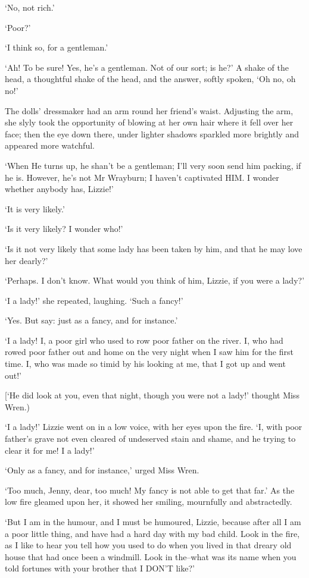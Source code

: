 ‘No, not rich.’

‘Poor?’

‘I think so, for a gentleman.’

‘Ah! To be sure! Yes, he’s a gentleman. Not of our sort; is he?’ A shake
of the head, a thoughtful shake of the head, and the answer, softly
spoken, ‘Oh no, oh no!’

The dolls’ dressmaker had an arm round her friend’s waist. Adjusting the
arm, she slyly took the opportunity of blowing at her own hair where
it fell over her face; then the eye down there, under lighter shadows
sparkled more brightly and appeared more watchful.

‘When He turns up, he shan’t be a gentleman; I’ll very soon send him
packing, if he is. However, he’s not Mr Wrayburn; I haven’t captivated
HIM. I wonder whether anybody has, Lizzie!’

‘It is very likely.’

‘Is it very likely? I wonder who!’

‘Is it not very likely that some lady has been taken by him, and that he
may love her dearly?’

‘Perhaps. I don’t know. What would you think of him, Lizzie, if you were
a lady?’

‘I a lady!’ she repeated, laughing. ‘Such a fancy!’

‘Yes. But say: just as a fancy, and for instance.’

‘I a lady! I, a poor girl who used to row poor father on the river. I,
who had rowed poor father out and home on the very night when I saw him
for the first time. I, who was made so timid by his looking at me, that
I got up and went out!’

[‘He did look at you, even that night, though you were not a lady!’
thought Miss Wren.)

‘I a lady!’ Lizzie went on in a low voice, with her eyes upon the fire.
‘I, with poor father’s grave not even cleared of undeserved stain and
shame, and he trying to clear it for me! I a lady!’

‘Only as a fancy, and for instance,’ urged Miss Wren.

‘Too much, Jenny, dear, too much! My fancy is not able to get that far.’
As the low fire gleamed upon her, it showed her smiling, mournfully and
abstractedly.

‘But I am in the humour, and I must be humoured, Lizzie, because after
all I am a poor little thing, and have had a hard day with my bad child.
Look in the fire, as I like to hear you tell how you used to do when you
lived in that dreary old house that had once been a windmill. Look in
the--what was its name when you told fortunes with your brother that I
DON’T like?’

